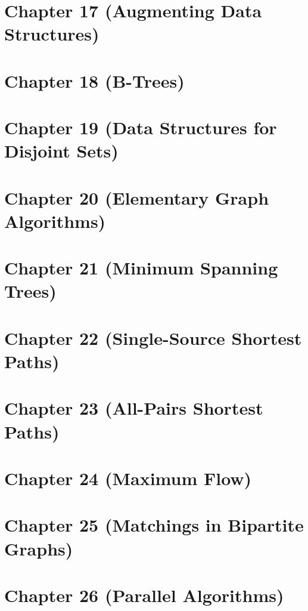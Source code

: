 \documentclass[11pt]{article}
\begin{document}
\section*{Chapter 17 (Augmenting Data Structures)}
\newpage

\section*{Chapter 18 (B-Trees)}
\newpage

\section*{Chapter 19 (Data Structures for Disjoint Sets)}
\newpage

\section*{Chapter 20 (Elementary Graph Algorithms)}
\newpage

\section*{Chapter 21 (Minimum Spanning Trees)}
\newpage

\section*{Chapter 22 (Single-Source Shortest Paths)}
\newpage

\section*{Chapter 23 (All-Pairs Shortest Paths)}
\newpage

\section*{Chapter 24 (Maximum Flow)}
\newpage

\section*{Chapter 25 (Matchings in Bipartite Graphs)}
\newpage

\section*{Chapter 26 (Parallel Algorithms)}
\newpage
\end{document}
